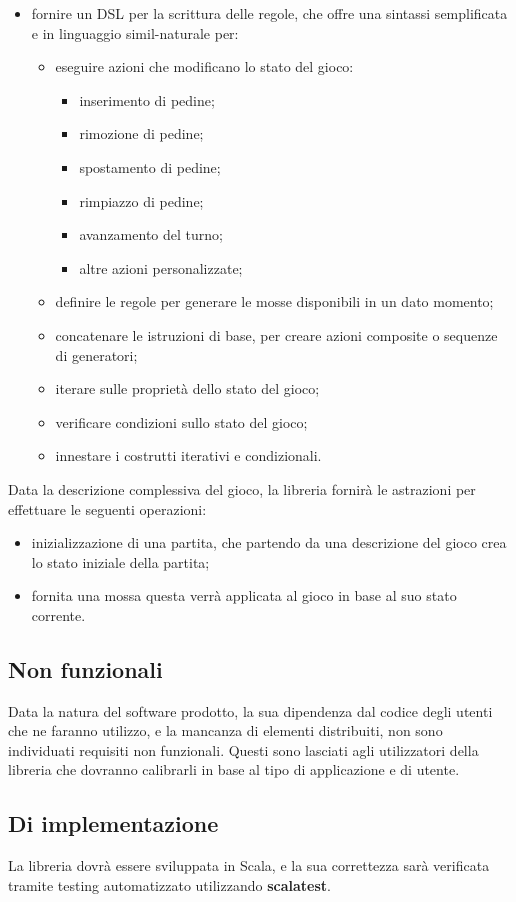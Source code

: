 \begin{itemize}
    \item fornire un DSL per la scrittura delle regole, che offre una sintassi semplificata e in linguaggio simil-naturale per:
    \begin{itemize}
        \item eseguire azioni che modificano lo stato del gioco:
        \begin{itemize}
            \item inserimento di pedine;
            \item rimozione di pedine;
            \item spostamento di pedine;
            \item rimpiazzo di pedine;
            \item avanzamento del turno;
            \item altre azioni personalizzate;
        \end{itemize}
        \item definire le regole per generare le mosse disponibili in un dato momento;
        \item concatenare le istruzioni di base, per creare azioni composite o sequenze di generatori; %
        \item iterare sulle proprietà dello stato del gioco;
        \item verificare condizioni sullo stato del gioco;
        \item innestare i costrutti iterativi e condizionali.
    \end{itemize}
\end{itemize}
%
Data la descrizione complessiva del gioco, la libreria fornirà le astrazioni per effettuare le seguenti operazioni:
%
\begin{itemize}
    \item inizializzazione di una partita, che partendo da una descrizione del gioco crea lo stato iniziale della partita;
    \item fornita una mossa questa verrà applicata al gioco in base al suo stato corrente.
\end{itemize}

\subsection{Non funzionali}

Data la natura del software prodotto, la sua dipendenza dal codice degli utenti che ne faranno utilizzo, e la mancanza di elementi distribuiti, non sono individuati requisiti non funzionali.
%
Questi sono lasciati agli utilizzatori della libreria che dovranno calibrarli in base al tipo di applicazione e di utente.

\subsection{Di implementazione}

La libreria dovrà essere sviluppata in Scala, e la sua correttezza sarà verificata tramite testing automatizzato utilizzando \textbf{scalatest}.